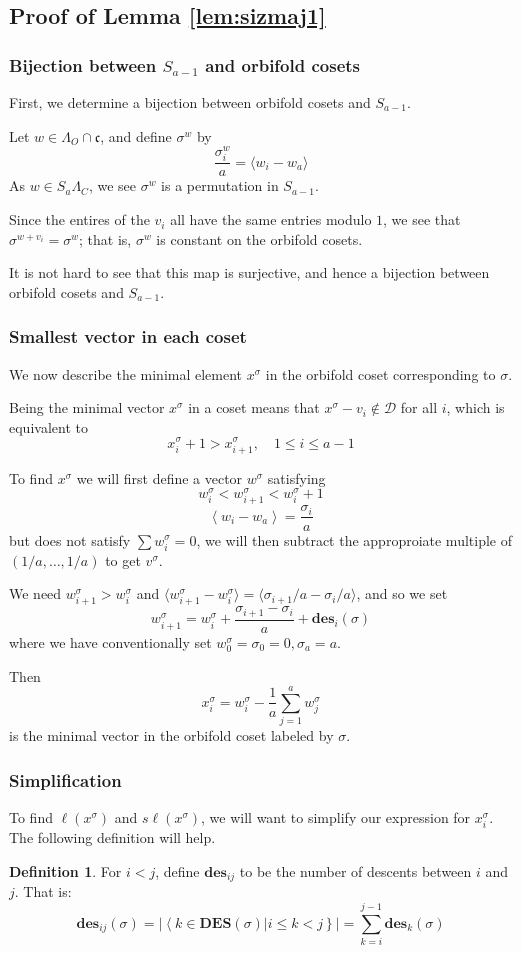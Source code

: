 \documentclass{amsart}[12pt]
\theoremstyle{definition}
\newtheorem{definition}[dummy]{Definition}
\newcommand{\sk}{s\ell}
\newcommand{\DES}{\mathbf{DES}}
\newcommand{\des}{\mathbf{des}}
\newcommand{\cone}{\mathfrak{c}}
\newcommand{\dominant}{\mathcal{D}}
\begin{document}
\subsection{Proof of Lemma \ref{lem:sizmaj1}}
\subsubsection{Bijection between $S_{a-1}$ and orbifold cosets}
First, we determine a bijection between orbifold cosets and $S_{a-1}$.  


Let $w\in\Lambda_O\cap \cone$, and define $\sigma^w$ by 
$$\frac{\sigma^w_i}{a}=\langle w_{i}-w_a\rangle$$
As $w\in S_a\Lambda_C$, we see $\sigma^w$ is a permutation in $S_{a-1}$.

Since the entires of the $v_i$ all have the same entries modulo $1$, we see that$\sigma^{w+v_i}=\sigma^w$; that is, $\sigma^w$ is constant on the orbifold cosets.  

It is not hard to see that this map is surjective, and hence a bijection between orbifold cosets and $S_{a-1}$.

\subsubsection{Smallest vector in each coset}
We now describe the minimal element $x^\sigma$ in the orbifold coset corresponding to $\sigma$.  

Being the minimal vector $x^\sigma$ in a coset means that $x^\sigma-v_i\notin\dominant$ for all $i$, which is equivalent to
$$x^\sigma_i+1>x^\sigma_{i+1},\quad 1\leq i\leq a-1$$

To find $x^\sigma$ we will first define a vector $w^\sigma$ satisfying
$$w^\sigma_i<w^\sigma_{i+1}<w^\sigma_i+1$$
$$\left\langle w_i-w_a\right\rangle=\frac{\sigma_i}{a}$$
but does not satisfy $\sum w_i^\sigma=0$, we will then subtract the approproiate multiple of $(1/a,\dots, 1/a)$ to get $v^\sigma$.

We need $w^\sigma_{i+1}>w^\sigma_i$ and $\langle w^\sigma_{i+1}-w^\sigma_i\rangle=\langle\sigma_{i+1}/a-\sigma_i/a\rangle$, and so we set
$$w^\sigma_{i+1}=w^\sigma_i+\frac{\sigma_{i+1}-\sigma_i}{a}+\des_i(\sigma)$$
where we have conventionally set $w^\sigma_0=\sigma_0=0, \sigma_a=a$.

Then
$$x_i^\sigma=w_i^\sigma-\frac{1}{a}\sum_{j=1}^a w^\sigma_j$$
is the minimal vector in the orbifold coset labeled by $\sigma$.
\subsubsection{Simplification}
 To find $\ell(x^\sigma)$ and $\sk(x^\sigma)$, we will want to simplify our expression for $x_i^\sigma$.  The following definition will help.
\begin{definition}
For $i<j$, define $\des_{ij}$ to be the number of descents between $i$ and $j$.  That is:
$$\des_{ij}(\sigma)=\left|\left\langle k\in\DES(\sigma)\big| i\leq k < j\right\}\right|=\sum_{k=i}^{j-1}\des_k(\sigma)$$
\end{definition}
\end{document}
